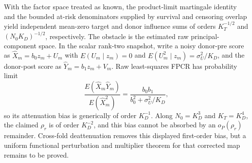With the factor space treated as known, the product-limit martingale identity and the bounded at-risk denominators supplied by survival and censoring overlap yield independent mean-zero target and donor influence sums of orders \(K_T^{-1/2}\) and \((N_0K_D)^{-1/2}\), respectively.  The obstacle is the estimated raw principal-component space.  In the scalar rank-two snapshot, write a noisy donor-pre score as \(\widehat X_m=b_0z_m+U_m\) with \(E(U_m\mid z_m)=0\) and \(E(U_m^2\mid z_m)=\sigma_U^2/K_D\), and the donor-post score as \(\widehat Y_m=b_1z_m+V_m\).  Raw least-squares FPCR has probability limit
\[
 \frac{E(\widehat X_m\widehat Y_m)}{E(\widehat X_m^2)}
 =\frac{b_0b_1}{b_0^2+\sigma_U^2/K_D},
\]
so its attenuation bias is generically of order \(K_D^{-1}\).  Along \(N_0=K_D^3\) and \(K_T=K_D^4\), the claimed \(\rho_r\) is of order \(K_D^{-2}\), and this bias cannot be absorbed by an \(o_P(\rho_r)\) remainder.  Cross-fold deattenuation removes this displayed first-order bias, but a uniform functional perturbation and multiplier theorem for that corrected map remains to be proved.
